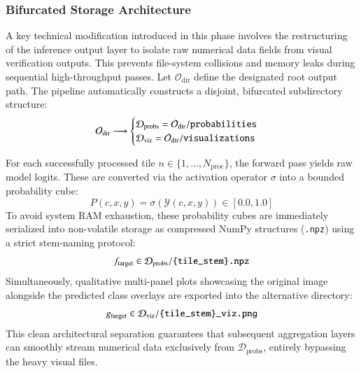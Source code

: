 \documentclass{aa}
\begin{document}
\subsubsection{Bifurcated Storage Architecture}
A key technical modification introduced in this phase involves the restructuring of the inference output layer to isolate raw numerical data fields from visual verification outputs. This prevents file-system collisions and memory leaks during sequential high-throughput passes. Let $\mathcal{O}_{\text{dir}}$ define the designated root output path. The pipeline automatically constructs a disjoint, bifurcated subdirectory structure:
\begin{equation*}
\mathcal{O}_{\text{dir}} \longrightarrow
\begin{cases}
\mathcal{D}_{\text{probs}} = \mathcal{O}_{\text{dir}} / \text{\texttt{probabilities}} \\
\mathcal{D}_{\text{viz}} = \mathcal{O}_{\text{dir}} / \text{\texttt{visualizations}}
\end{cases}
\end{equation*}

For each successfully processed tile $n \in \{1, \dots, N_{\text{proc}}\}$, the forward pass yields raw model logits. These are converted via the activation operator $\sigma$ into a bounded probability cube:
\begin{equation*}
P(c, x, y) = \sigma\left(\mathcal{Y}(c, x, y)\right) \in [0.0, 1.0]
\end{equation*}
To avoid system RAM exhaustion, these probability cubes are immediately serialized into non-volatile storage as compressed NumPy structures (\texttt{.npz}) using a strict stem-naming protocol:
\begin{equation*}
f_{\text{target}} \in \mathcal{D}_{\text{probs}} / \text{\texttt{\{tile\_stem\}.npz}}
\end{equation*}
Simultaneously, qualitative multi-panel plots showcasing the original image alongside the predicted class overlays are exported into the alternative directory:
\begin{equation}
g_{\text{target}} \in \mathcal{D}_{\text{viz}} / \text{\texttt{\{tile\_stem\}\_viz.png}}
\end{equation}
This clean architectural separation guarantees that subsequent aggregation layers can smoothly stream numerical data exclusively from $\mathcal{D}_{\text{probs}}$, entirely bypassing the heavy visual files.
\end{document}
